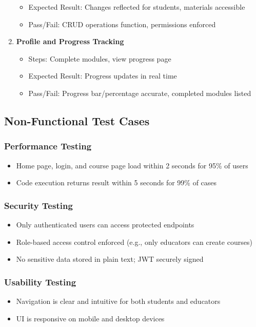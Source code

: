 \documentclass[a4paper,11pt]{scrartcl}
\begin{document}
\begin{enumerate}[leftmargin=*]
\begin{itemize}
            \item Expected Result: Changes reflected for students, materials accessible
            \item Pass/Fail: CRUD operations function, permissions enforced
        \end{itemize}
    \item \textbf{Profile and Progress Tracking}
        \begin{itemize}
            \item Steps: Complete modules, view progress page
            \item Expected Result: Progress updates in real time
            \item Pass/Fail: Progress bar/percentage accurate, completed modules listed
        \end{itemize}
\end{enumerate}

\subsection{Non-Functional Test Cases}

\subsubsection{Performance Testing}
\begin{itemize}[leftmargin=*]
    \item Home page, login, and course page load within 2 seconds for 95\% of users
    \item Code execution returns result within 5 seconds for 99\% of cases
\end{itemize}

\subsubsection{Security Testing}
\begin{itemize}[leftmargin=*]
    \item Only authenticated users can access protected endpoints
    \item Role-based access control enforced (e.g., only educators can create courses)
    \item No sensitive data stored in plain text; JWT securely signed
\end{itemize}

\subsubsection{Usability Testing}
\begin{itemize}[leftmargin=*]
    \item Navigation is clear and intuitive for both students and educators
    \item UI is responsive on mobile and desktop devices
\end{itemize}
\end{document}
